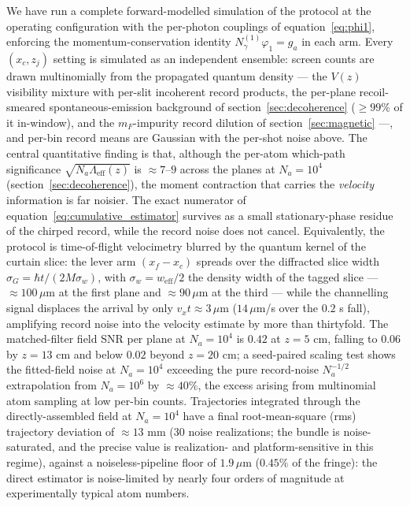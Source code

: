 \documentclass[11pt,a4paper]{article}
\begin{document}
We have run a complete forward-modelled simulation of the protocol at the operating configuration with the per-photon couplings of equation~\eqref{eq:phi1}, enforcing the momentum-conservation identity $N_\gamma^{(1)}\varphi_1 = g_a$ in each arm. Every $(x_c, z_j)$ setting is simulated as an independent ensemble: screen counts are drawn multinomially from the propagated quantum density --- the $V(z)$ visibility mixture with per-slit incoherent record products, the per-plane recoil-smeared spontaneous-emission background of section~\ref{sec:decoherence} ($\geq 99\%$ of it in-window), and the $m_F$-impurity record dilution of section~\ref{sec:magnetic} ---, and per-bin record means are Gaussian with the per-shot noise above. The central quantitative finding is that, although the per-atom which-path significance $\sqrt{N_a\Lambda_\text{eff}(z)}$ is $\approx 7$--$9$ across the planes at $N_a = 10^4$ (section~\ref{sec:decoherence}), the moment contraction that carries the \emph{velocity} information is far noisier. The exact numerator of equation~\eqref{eq:cumulative_estimator} survives as a small stationary-phase residue of the chirped record, while the record noise does not cancel. Equivalently, the protocol is time-of-flight velocimetry blurred by the quantum kernel of the curtain slice: the lever arm $(x_f - x_c)$ spreads over the diffracted slice width $\sigma_G = \hbar t/(2M\sigma_w)$, with $\sigma_w = w_\text{eff}/2$ the density width of the tagged slice --- $\approx 100\,\mu$m at the first plane and $\approx 90\,\mu$m at the third --- while the channelling signal displaces the arrival by only $v_x t \approx 3\,\mu$m ($14\,\mu$m/s over the $0.2$ s fall), amplifying record noise into the velocity estimate by more than thirtyfold. The matched-filter field SNR per plane at $N_a = 10^4$ is $0.42$ at $z = 5$ cm, falling to $0.06$ by $z = 13$ cm and below $0.02$ beyond $z = 20$ cm; a seed-paired scaling test shows the fitted-field noise at $N_a = 10^4$ exceeding the pure record-noise $N_a^{-1/2}$ extrapolation from $N_a = 10^6$ by $\approx 40\%$, the excess arising from multinomial atom sampling at low per-bin counts. Trajectories integrated through the directly-assembled field at $N_a = 10^4$ have a final root-mean-square (rms) trajectory deviation of $\approx 13$ mm (30 noise realizations; the bundle is noise-saturated, and the precise value is realization- and platform-sensitive in this regime), against a noiseless-pipeline floor of $1.9\,\mu$m ($0.45\%$ of the fringe): the direct estimator is noise-limited by nearly four orders of magnitude at experimentally typical atom numbers.
\end{document}

